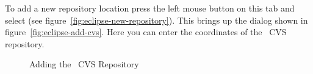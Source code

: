 To add a new repository location press the left mouse button on this
tab and select  (see
figure~\ref{fig:eclipse-new-repository}). This brings up the dialog
shown in figure~\ref{fig:eclipse-add-cvs}. Here you can enter the
coordinates of the \ExTeX\ CVS repository.
\begin{figure}[htp]
  \hbox{}\hfill
  \hfill
  \caption{Adding the \ExTeX\ CVS Repository}
\end{figure}

